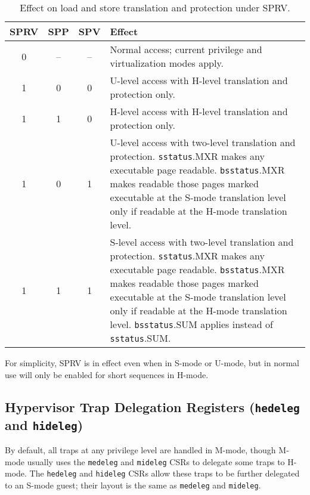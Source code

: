 \begin{table*}[h!]
\begin{center}
\begin{tabular}{|c|c|c||p{5in}|}
  \hline
   SPRV & SPP & SPV & Effect \\ \hline \hline
   0    & --  & -- & Normal access; current privilege and virtualization modes apply. \\ \hline
   1    & 0   & 0  & U-level access with H-level translation and protection only. \\ \hline
   1    & 1   & 0  & H-level access with H-level translation and protection only. \\ \hline
   1    & 0   & 1  & U-level access with two-level translation and protection. {\tt sstatus}.MXR makes any executable page readable.  {\tt bsstatus}.MXR makes readable those pages marked executable at the S-mode translation level only if readable at the H-mode translation level. \\ \hline
   1    & 1   & 1  & S-level access with two-level translation and protection. {\tt sstatus}.MXR makes any executable page readable.  {\tt bsstatus}.MXR makes readable those pages marked executable at the S-mode translation level only if readable at the H-mode translation level. {\tt bsstatus}.SUM applies instead of {\tt sstatus}.SUM. \\ \hline
 \end{tabular}
\end{center}
\caption{Effect on load and store translation and protection under SPRV.}
\label{h-sprv}
\end{table*}

\begin{commentary}
For simplicity, SPRV is in effect even when in S-mode or U-mode, but in normal
use will only be enabled for short sequences in H-mode.
\end{commentary}

\subsection{Hypervisor Trap Delegation Registers ({\tt hedeleg} and {\tt hideleg})}

By default, all traps at any privilege level are handled in M-mode, though
M-mode usually uses the {\tt medeleg} and {\tt mideleg} CSRs to delegate
some traps to H-mode.  The {\tt hedeleg} and {\tt hideleg} CSRs allow these
traps to be further delegated to an S-mode guest; their layout is the same
as {\tt medeleg} and {\tt mideleg}.

